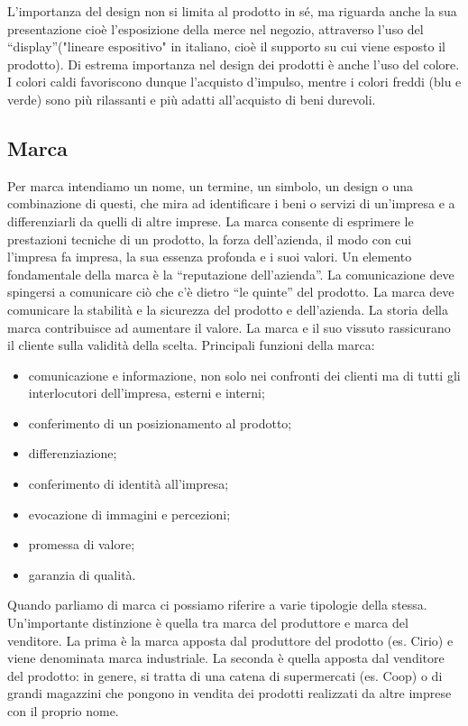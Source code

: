 L’importanza del design non si limita al prodotto in sé, ma riguarda anche la sua presentazione cioè l’esposizione della merce nel negozio, attraverso l’uso del “display”("lineare espositivo"  in italiano, cioè il supporto su cui viene esposto il prodotto). \newline
Di estrema importanza nel design dei prodotti è anche l’uso del colore. I colori caldi favoriscono dunque l’acquisto d’impulso, mentre i colori freddi (blu e verde) sono più rilassanti e più adatti all’acquisto di beni durevoli. 

\subsection{Marca}
Per marca intendiamo un nome, un termine, un simbolo, un design o una combinazione di questi, che mira ad identificare i beni o servizi di un’impresa e a differenziarli da quelli di altre imprese.
La marca consente di esprimere le prestazioni tecniche di un prodotto, la forza dell’azienda, il modo con cui l’impresa fa impresa, la sua essenza profonda e i suoi valori. \newline
Un elemento fondamentale della marca è la “reputazione dell’azienda”. La comunicazione deve spingersi a comunicare ciò che c’è dietro “le quinte” del prodotto. \newline
La marca deve comunicare la stabilità e la sicurezza del prodotto e dell’azienda. \newline
La storia della marca contribuisce ad aumentare il valore. La marca e il suo vissuto rassicurano il cliente sulla validità della scelta. \newline
Principali funzioni della marca:
\begin{itemize}
	\item comunicazione e informazione, non solo nei confronti dei clienti ma di tutti gli interlocutori dell’impresa, esterni e interni;
	\item conferimento di un posizionamento al prodotto;
	\item differenziazione;
	\item conferimento di identità all’impresa;
	\item evocazione di immagini e percezioni;
	\item promessa di valore;
	\item garanzia di qualità.
\end{itemize}
Quando parliamo di marca ci possiamo riferire a varie tipologie della stessa. Un’importante distinzione è quella tra marca del produttore e marca del venditore. La prima è la marca apposta dal produttore del prodotto (es. Cirio) e viene denominata marca industriale. La seconda è quella apposta dal venditore del prodotto: in genere, si tratta di una catena di supermercati (es. Coop) o di grandi magazzini che pongono in vendita dei prodotti realizzati da altre imprese con il proprio nome.

